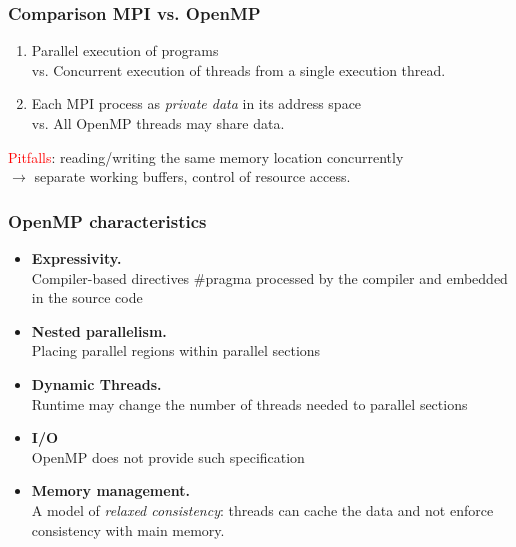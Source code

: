 \begin{frame}
\frametitle{Comparison MPI vs. OpenMP}


\begin{minipage}{0.45\textwidth}
\begin{center}
    \scalebox{0.4}{}
\end{center}
\end{minipage}
\begin{minipage}{0.5\textwidth}
  \begin{center}
    \scalebox{0.5}{}
  \end{center}
\end{minipage}

\bigskip
\begin{enumerate}
\item Parallel execution of programs\\
      vs. Concurrent execution of threads from a single execution thread.\\[2ex]
\item Each MPI process as \textit{private data} in its address space\\
      vs. All OpenMP threads may share data.
\end{enumerate}

\bigskip
\textcolor{red}{Pitfalls}: reading/writing the same memory location concurrently\\
$\rightarrow$ separate working buffers, control of resource access.

\end{frame}

\begin{frame}
\frametitle{OpenMP characteristics}

\begin{itemize}
\item \textbf{Expressivity.}\\
Compiler-based directives \#pragma processed by the compiler and embedded in the source code

\medskip
\item \textbf{Nested parallelism.}\\
Placing parallel regions within parallel sections

\medskip
\item \textbf{Dynamic Threads.}\\
Runtime may change the number of threads needed to parallel sections

\medskip
\item \textbf{I/O}\\
OpenMP does not provide such specification

\medskip
\item \textbf{Memory management.}\\
A model of \textit{relaxed consistency}: threads can cache the data and not enforce consistency with main memory.
\end{itemize}

\end{frame}

